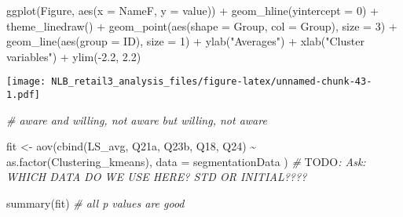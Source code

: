 \documentclass[
]{article}
\newenvironment{Shaded}{\begin{snugshade}}{\end{snugshade}}
\newcommand{\AlertTok}[1]{\textcolor[rgb]{0.94,0.16,0.16}{#1}}
\newcommand{\AttributeTok}[1]{\textcolor[rgb]{0.77,0.63,0.00}{#1}}
\newcommand{\CommentTok}[1]{\textcolor[rgb]{0.56,0.35,0.01}{\textit{#1}}}
\newcommand{\DecValTok}[1]{\textcolor[rgb]{0.00,0.00,0.81}{#1}}
\newcommand{\FloatTok}[1]{\textcolor[rgb]{0.00,0.00,0.81}{#1}}
\newcommand{\FunctionTok}[1]{\textcolor[rgb]{0.00,0.00,0.00}{#1}}
\newcommand{\NormalTok}[1]{#1}
\newcommand{\OtherTok}[1]{\textcolor[rgb]{0.56,0.35,0.01}{#1}}
\newcommand{\SpecialCharTok}[1]{\textcolor[rgb]{0.00,0.00,0.00}{#1}}
\newcommand{\StringTok}[1]{\textcolor[rgb]{0.31,0.60,0.02}{#1}}
\begin{document}
\begin{Shaded}
\begin{Highlighting}[]
\FunctionTok{ggplot}\NormalTok{(Figure, }\FunctionTok{aes}\NormalTok{(}\AttributeTok{x =}\NormalTok{ NameF, }\AttributeTok{y =}\NormalTok{ value)) }\SpecialCharTok{+}
  \FunctionTok{geom\_hline}\NormalTok{(}\AttributeTok{yintercept =} \DecValTok{0}\NormalTok{) }\SpecialCharTok{+}
  \FunctionTok{theme\_linedraw}\NormalTok{() }\SpecialCharTok{+}
  \FunctionTok{geom\_point}\NormalTok{(}\FunctionTok{aes}\NormalTok{(}\AttributeTok{shape =}\NormalTok{ Group, }\AttributeTok{col =}\NormalTok{ Group), }\AttributeTok{size =} \DecValTok{3}\NormalTok{) }\SpecialCharTok{+}
  \FunctionTok{geom\_line}\NormalTok{(}\FunctionTok{aes}\NormalTok{(}\AttributeTok{group =}\NormalTok{ ID), }\AttributeTok{size =} \DecValTok{1}\NormalTok{) }\SpecialCharTok{+}
  \FunctionTok{ylab}\NormalTok{(}\StringTok{"Averages"}\NormalTok{) }\SpecialCharTok{+}
  \FunctionTok{xlab}\NormalTok{(}\StringTok{"Cluster variables"}\NormalTok{) }\SpecialCharTok{+}
  \FunctionTok{ylim}\NormalTok{(}\SpecialCharTok{{-}}\FloatTok{2.2}\NormalTok{, }\FloatTok{2.2}\NormalTok{)}
\end{Highlighting}
\end{Shaded}

\texttt{[image: NLB\_retail3\_analysis\_files/figure-latex/unnamed-chunk-43-1.pdf]}

\begin{Shaded}
\begin{Highlighting}[]
\CommentTok{\# aware and willing, not aware but willing, not aware}
\end{Highlighting}
\end{Shaded}

\begin{Shaded}
\begin{Highlighting}[]
\NormalTok{fit }\OtherTok{\textless{}{-}} \FunctionTok{aov}\NormalTok{(}\FunctionTok{cbind}\NormalTok{(LS\_avg, Q21a, Q23b, Q18, Q24) }\SpecialCharTok{\textasciitilde{}} \FunctionTok{as.factor}\NormalTok{(Clustering\_kmeans), }\AttributeTok{data =}\NormalTok{ segmentationData ) }
\CommentTok{\# }\AlertTok{TODO}\CommentTok{: Ask: WHICH DATA DO WE USE HERE? STD OR INITIAL????}

\FunctionTok{summary}\NormalTok{(fit) }\CommentTok{\# all p values are good}
\end{Highlighting}
\end{Shaded}
\end{document}
